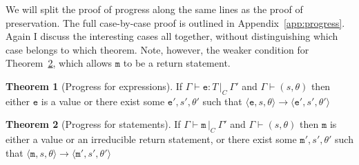 \documentclass[12pt,a4paper,twoside,openright]{report}
\theoremstyle{definition}
\theoremstyle{dotless}
\newtheorem{theorem}{Theorem}[section]
\newcommand{\typable}[2][ ]{\Gamma{}\vdash\mathtt{#2}\, |_C#1\:\Gamma#1'}
\newcommand{\typed}[2]{\Gamma{}\vdash\mathtt{#1}: #2\,|_C\:\Gamma'}
\newcommand{\transition}[6]{\langle{}\mathtt{#1},#2,#3\rangle{}\rightarrow{}\langle{}\mathtt{#4},#5,#6\rangle}
\begin{document}
We will split the proof of progress along the same lines as the proof of
preservation. The full case-by-case proof is outlined in Appendix~\ref{app:progress}.
Again I discuss the interesting cases all together, without distinguishing which
case belongs to which theorem. Note, however, the weaker condition for Theorem~\ref{mProgress},
which allows $\mathtt{m}$ to be a return statement.

\begin{theorem}[Progress for expressions]\label{expProgress} If
  $\typed{e}{T}$ and $\Gamma \vdash (s, \theta)$ then either $\mathtt{e}$ is a value or
  there exist some $\mathtt{e}',s', \theta'$ such that
  $\transition{e}{s}{\theta}{e'}{s'}{\theta'}$ \end{theorem}
\begin{theorem}[Progress for statements]\label{mProgress}
  If $\typable{\mathtt{m}}$ and $\Gamma \vdash (s, \theta)$ then $\mathtt{m}$ is either a
  value or an irreducible return statement, or there exist some $\mathtt{m}',s', \theta'$ such that
  $\transition{m}{s}{\theta}{m'}{s'}{\theta'}$ 
\end{theorem}
\end{document}
